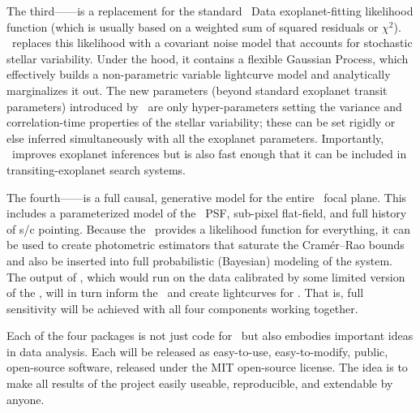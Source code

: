 \documentclass[letterpaper,12pt]{article}
\begin{document}
The third---\George---is a replacement for the standard \Kepler\ Data
exoplanet-fitting likelihood function (which is usually based on a weighted sum
of squared residuals or $\chi^2$).
\George\ replaces this likelihood with a covariant noise model that accounts for
stochastic stellar variability.
Under the hood, it contains a flexible Gaussian Process, which effectively
builds a non-parametric variable lightcurve model and analytically marginalizes
it out.
The new parameters (beyond standard exoplanet transit parameters) introduced
by \George\ are only hyper-parameters setting the variance and correlation-time
properties of the stellar variability; these can be set rigidly or else inferred
simultaneously with all the exoplanet parameters.
Importantly, \George\ improves exoplanet inferences but is also fast enough that
it can be included in transiting-exoplanet search systems.

The fourth---\kpsf---is a full causal, generative model for the entire \Kepler\
focal plane.
This includes a parameterized model of the \Kepler\ PSF, sub-pixel flat-field,
and full history of s/c pointing.
Because the \kpsf\ provides a likelihood function for everything, it can be used
to create photometric estimators that saturate the Cram\'er--Rao bounds and also
be inserted into full probabilistic (Bayesian) modeling of the system.
The output of \kpsf, which would run on the data calibrated by some limited
version of the \PLM, will in turn inform the \OWL\ and create lightcurves for
\George.
That is, full sensitivity will be achieved with all four components working
together.

Each of the four packages is not just code for \Kepler\ but also embodies
important ideas in data analysis.
Each will be released as easy-to-use, easy-to-modify, public, open-source
software, released under the MIT open-source license.
The idea is to make all results of the project easily useable, reproducible, and
extendable by anyone.
\end{document}
